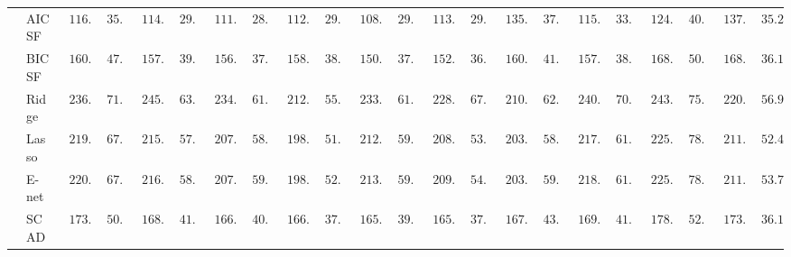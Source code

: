 \begin{tabular}{ll|ll|llllll|llllll|llllll}
 & AIC SF  & $\phantom{0}116.02$ & $\phantom{0}35.92$ & $\phantom{0}114.35$ & $\phantom{0}29.41$ & $\phantom{0}111.17$ & $\phantom{0}28.37$ & $\phantom{0}112.35$ & $\phantom{0}29.79$ & $\phantom{0}108.93$ & $\phantom{0}29.65$ & $\phantom{0}113.90$ & $\phantom{0}29.10$ & $\phantom{0}135.18$ & $\phantom{0}37.55$ & $\phantom{0}115.98$ & $\phantom{0}33.50$ & $\phantom{0}124.35$ & $\phantom{0}40.77$ & $\phantom{0}137.64$ & $\phantom{0}35.25$ \\
 & BIC SF  & $\phantom{0}160.28$ & $\phantom{0}47.80$ & $\phantom{0}157.92$ & $\phantom{0}39.84$ & $\phantom{0}156.21$ & $\phantom{0}37.86$ & $\phantom{0}158.46$ & $\phantom{0}38.22$ & $\phantom{0}150.95$ & $\phantom{0}37.50$ & $\phantom{0}152.74$ & $\phantom{0}36.09$ & $\phantom{0}160.07$ & $\phantom{0}41.69$ & $\phantom{0}157.70$ & $\phantom{0}38.14$ & $\phantom{0}168.31$ & $\phantom{0}50.20$ & $\phantom{0}168.01$ & $\phantom{0}36.15$ \\
 & Ridge  & $\phantom{0}236.39$ & $\phantom{0}71.11$ & $\phantom{0}245.92$ & $\phantom{0}63.77$ & $\phantom{0}234.33$ & $\phantom{0}61.97$ & $\phantom{0}212.63$ & $\phantom{0}55.06$ & $\phantom{0}233.19$ & $\phantom{0}61.55$ & $\phantom{0}228.80$ & $\phantom{0}67.01$ & $\phantom{0}210.68$ & $\phantom{0}62.71$ & $\phantom{0}240.48$ & $\phantom{0}70.19$ & $\phantom{0}243.75$ & $\phantom{0}75.28$ & $\phantom{0}220.75$ & $\phantom{0}56.96$ \\
 & Lasso  & $\phantom{0}219.31$ & $\phantom{0}67.40$ & $\phantom{0}215.23$ & $\phantom{0}57.57$ & $\phantom{0}207.41$ & $\phantom{0}58.68$ & $\phantom{0}198.75$ & $\phantom{0}51.87$ & $\phantom{0}212.52$ & $\phantom{0}59.28$ & $\phantom{0}208.33$ & $\phantom{0}53.31$ & $\phantom{0}203.37$ & $\phantom{0}58.90$ & $\phantom{0}217.55$ & $\phantom{0}61.69$ & $\phantom{0}225.77$ & $\phantom{0}78.23$ & $\phantom{0}211.06$ & $\phantom{0}52.44$ \\
 & E-net  & $\phantom{0}220.15$ & $\phantom{0}67.50$ & $\phantom{0}216.12$ & $\phantom{0}58.13$ & $\phantom{0}207.38$ & $\phantom{0}59.35$ & $\phantom{0}198.94$ & $\phantom{0}52.58$ & $\phantom{0}213.54$ & $\phantom{0}59.07$ & $\phantom{0}209.80$ & $\phantom{0}54.23$ & $\phantom{0}203.40$ & $\phantom{0}59.21$ & $\phantom{0}218.11$ & $\phantom{0}61.96$ & $\phantom{0}225.06$ & $\phantom{0}78.15$ & $\phantom{0}211.70$ & $\phantom{0}53.73$ \\
 & SCAD  & $\phantom{0}173.42$ & $\phantom{0}50.70$ & $\phantom{0}168.15$ & $\phantom{0}41.57$ & $\phantom{0}166.11$ & $\phantom{0}40.57$ & $\phantom{0}166.21$ & $\phantom{0}37.82$ & $\phantom{0}165.26$ & $\phantom{0}39.74$ & $\phantom{0}165.23$ & $\phantom{0}37.76$ & $\phantom{0}167.18$ & $\phantom{0}43.19$ & $\phantom{0}169.70$ & $\phantom{0}41.11$ & $\phantom{0}178.67$ & $\phantom{0}52.22$ & $\phantom{0}173.28$ & $\phantom{0}36.13$ \\

\end{tabular}
